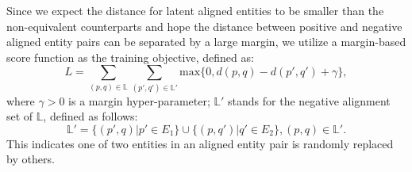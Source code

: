 	 Since we expect the distance for latent aligned entities to be smaller than the non-equivalent counterparts and hope the distance
between positive and negative aligned entity pairs can be separated by a large margin, we utilize a margin-based score function as the
training objective, defined as:
	\begin{equation}
	L=\sum\limits_{(p,q)\in \mathbb{L}}\sum\limits_{(p',q')\in \mathbb{L'}}\mathrm{max}\{0,d(p,q)-d(p',q')+\gamma\},
	\end{equation}
	where $\gamma > 0$ is a margin hyper-parameter; $\mathbb{L'}$ stands for the negative alignment set of $\mathbb{L}$, defined as follows:
	\begin{equation}
	\mathbb{L'}=\{(p',q)|p'\in E_1\}\cup\{(p,q')|q'\in E_2\}, (p,q)\in \mathbb{L'}.
	\end{equation}
	This indicates one of two entities in an aligned entity pair is randomly replaced by others.
	

	
	

	
	
